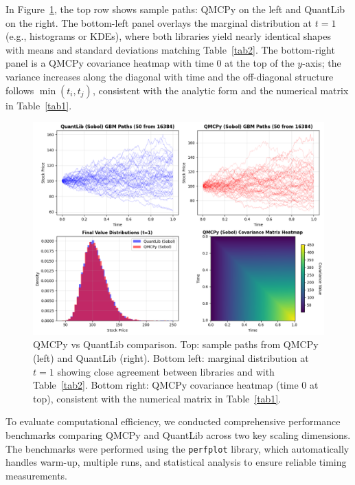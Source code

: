\documentclass{article}
\begin{document}


 In Figure~\ref{fig:qmcpy_quantlib_comparison}, the top row shows sample paths: QMCPy on the left and QuantLib on the right. The bottom-left panel overlays the marginal distribution at $t=1$ (e.g., histograms or KDEs), where both libraries yield nearly identical shapes with means and standard deviations matching Table~\ref{tab2}. The bottom-right panel is a QMCPy covariance heatmap with time 0 at the top of the $y$-axis; the variance increases along the diagonal with time and the off-diagonal structure follows $\min(t_i,t_j)$, consistent with the analytic form and the numerical matrix in Table~\ref{tab1}.

\begin{figure}[h]
\centering
\includegraphics[width=1\textwidth]{images/figure_5.png}
\caption{QMCPy vs QuantLib comparison. Top: sample paths from QMCPy (left) and QuantLib (right). Bottom left: marginal distribution at $t=1$ showing close agreement between libraries and with Table~\ref{tab2}. Bottom right: QMCPy covariance heatmap (time 0 at top), consistent with the numerical matrix in Table~\ref{tab1}.}
\label{fig:qmcpy_quantlib_comparison}
\end{figure}

To evaluate computational efficiency, we conducted comprehensive performance benchmarks comparing QMCPy and QuantLib across two key scaling dimensions. The benchmarks were performed using the \texttt{perfplot} library, which automatically handles warm-up, multiple runs, and statistical analysis to ensure reliable timing measurements. 
\end{document}
